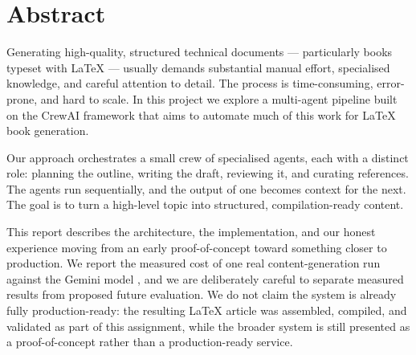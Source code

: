 
\chapter*{Abstract}

Generating high-quality, structured technical documents --- particularly books
typeset with \LaTeX{} --- usually demands substantial manual effort,
specialised knowledge, and careful attention to detail. The process is
time-consuming, error-prone, and hard to scale. In this project we explore a
multi-agent pipeline built on the CrewAI framework that aims to automate much
of this work for \LaTeX{} book generation.

Our approach orchestrates a small crew of specialised agents, each with a
distinct role: planning the outline, writing the draft, reviewing it, and
curating references. The agents run sequentially, and the output of one
becomes context for the next. The goal is to turn a high-level topic into
structured, compilation-ready content.

This report describes the architecture, the implementation, and our honest
experience moving from an early proof-of-concept toward something closer to
production. We report the measured cost of one real content-generation run
against the Gemini model , and we are
deliberately careful to separate measured results from proposed future
evaluation. We do not claim the system is already fully production-ready: the
resulting \LaTeX{} article was assembled, compiled, and validated as part of
this assignment, while the broader system is still presented as a
proof-of-concept rather than a production-ready service.
